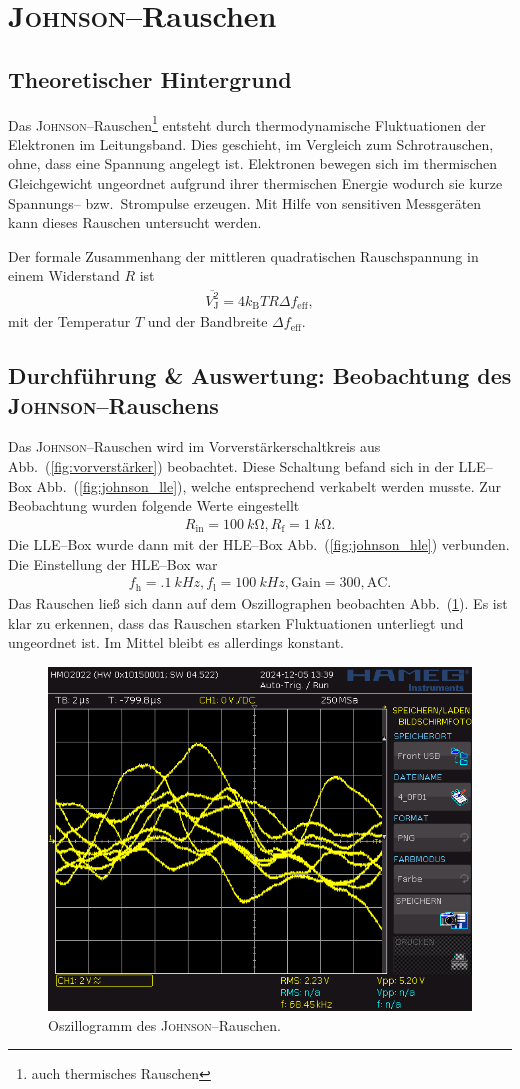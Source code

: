 \documentclass[sn-mathphys-num,iicol]{sn-jnl}
\theoremstyle{thmstyleone}
\theoremstyle{thmstyletwo}
\theoremstyle{thmstylethree}
\begin{document}
\section{\textsc{Johnson}--Rauschen}
\subsection{Theoretischer Hintergrund}
Das \textsc{Johnson}--Rauschen\footnote{auch thermisches Rauschen} entsteht durch thermodynamische Fluktuationen der Elektronen im Leitungsband.
Dies geschieht, im Vergleich zum Schrotrauschen, ohne, dass eine Spannung angelegt ist.
Elektronen bewegen sich im thermischen Gleichgewicht ungeordnet aufgrund ihrer thermischen Energie wodurch sie kurze Spannungs-- bzw.\ Strompulse erzeugen.
Mit Hilfe von sensitiven Messgeräten kann dieses Rauschen untersucht werden.

Der formale Zusammenhang der mittleren quadratischen Rauschspannung in einem Widerstand $R$ ist
\begin{align}
	\overline{V^2_\text{J}}=4k_\text{B}TR\Delta f_\text{eff}
	,\end{align}
mit der Temperatur $T$ und der Bandbreite $\Delta f_\text{eff}$.

\subsection{Durchführung \& Auswertung: Beobachtung des \textsc{Johnson}--Rauschens}
Das \textsc{Johnson}--Rauschen wird im Vorverstärkerschaltkreis aus Abb.\ (\ref{fig:vorverstärker}) beobachtet.
Diese Schaltung befand sich in der LLE--Box Abb.\ (\ref{fig:johnson_lle}), welche entsprechend verkabelt werden musste.
Zur Beobachtung wurden folgende Werte eingestellt
\begin{align}
	R_\text{in}=\SI{100}{k\ohm},R_\text{f}=\SI{1}{k\ohm}
	.\end{align}
Die LLE--Box wurde dann mit der HLE--Box Abb.\ (\ref{fig:johnson_hle}) verbunden.
Die Einstellung der HLE--Box war
\begin{align}
	f_\text{h}=\SI{.1}{kHz},f_\text{l}=\SI{100}{kHz},\text{Gain}=300,\text{AC}
	.\end{align}
Das Rauschen ließ sich dann auf dem Oszillographen beobachten Abb.\ (\ref{fig:johnson_oszi}).
Es ist klar zu erkennen, dass das Rauschen starken Fluktuationen unterliegt und ungeordnet ist.
Im Mittel bleibt es allerdings konstant.

\begin{figure}[t]
	\centering
	\includegraphics[width=.5\textwidth]{../data/4_0F01.png}
	\caption{Oszillogramm des \textsc{Johnson}--Rauschen.} \label{fig:johnson_oszi}
\end{figure}
\end{document}
